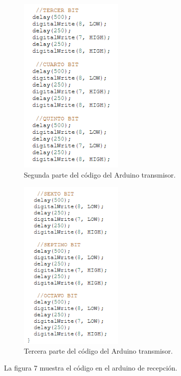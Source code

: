 \documentclass{article}
\begin{document}
\newpage

\begin{figure}[h]
\includegraphics[width=5cm]{codigo_arduino1_2.PNG}
\centering
\caption{Segunda parte del código del Arduino transmisor.}
\label{fig:codigo_arduino1_2.PNG}
\end{figure}

\newpage

\begin{figure}[h]
\includegraphics[width=5cm]{codigo_arduino1_3.PNG}
\centering
\caption{Tercera parte del código del Arduino transmisor.}
\label{fig:codigo_arduino1_3.PNG}
\end{figure}


La figura 7 muestra el código en el arduino de recepción.\\

\newpage
\end{document}
